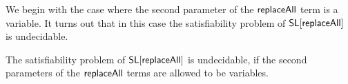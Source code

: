 %
%
%
%

We begin with the case where the second parameter of the $\mathsf{replaceAll}$ term is a variable. It turns out that in this case the satisfiability problem of $\mathsf{SL}[\mathsf{replaceAll}]$ is undecidable.

\begin{proposition}\label{prop-und-pat-var}
The satisfiability problem of $\mathsf{SL}[\mathsf{replaceAll}]$ is undecidable, if the second parameters of the $\mathsf{replaceAll}$ terms are allowed to be variables.
\end{proposition}

